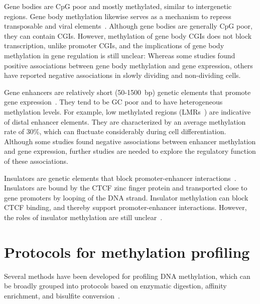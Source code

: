 Gene bodies are CpG poor and mostly methylated, similar to intergenetic regions. Gene body methylation likewise serves as a mechanism to repress transposable and viral elements~\citep{moore_dna_2013,jones_functions_2012,robertson_dna_2005}. Although gene bodies are generally CpG poor, they can contain CGIs. However, methylation of gene body CGIs does not block transcription, unlike promoter CGIs, and the implications of gene body methylation in gene regulation is still unclear: Whereas some studies found positive associations between gene body methylation and gene expression, others have reported negative associations in slowly dividing and non-dividing cells.

Gene enhancers are relatively short (50-1500~bp) genetic elements that promote gene expression~\citep{blackwood_going_1998,pennacchio_enhancers:_2013}. They tend to be GC poor and to have heterogeneous methylation levels. For example, low methylated regions (LMRs~\citep{stadler_dna-binding_2011}) are indicative of distal enhancer elements. They are characterized by an average methylation rate of 30\%, which can fluctuate considerably during cell differentiation. Although some studies found negative associations between enhancer methylation and gene expression, further studies are needed to explore the regulatory function of these associations.

Insulators are genetic elements that block promoter-enhancer interactions~\citep{burgess-beusse_insulation_2002}. Insulators are bound by the CTCF zinc finger protein and transported close to gene promoters by looping of the DNA strand. Insulator methylation can block CTCF binding, and thereby support promoter-enhancer interactions. However, the roles of insulator methylation are still unclear~\citep{moore_dna_2013,jones_functions_2012}.

\section{Protocols for methylation profiling} \label{sec:intro_proto}

Several methods have been developed for profiling DNA methylation, which can be broadly grouped into protocols based on enzymatic digestion, affinity enrichment, and bisulfite conversion~\citep{yong_profiling_2016,schwartzman_single-cell_2015,plongthongkum_advances_2014,huang_profiling_2010,laird_principles_2010-1}.

